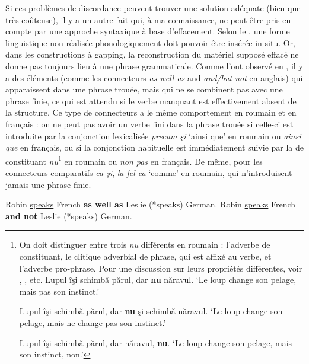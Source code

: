 Si ces problèmes de discordance peuvent trouver une solution adéquate (bien que très coûteuse), il y a un autre fait qui, à ma connaissance, ne peut être pris en compte par une approche syntaxique à base d’effacement. Selon le  \citep{Chomsky1964}, une forme linguistique non réalisée phonologiquement doit pouvoir être insérée in situ. Or, dans les constructions à gapping, la reconstruction du matériel supposé effacé ne donne pas toujours lieu à une phrase grammaticale. Comme l’ont observé \citet{CulicoverEtAl2005} en , il y a des éléments (comme les connecteurs \textit{as well as} and \textit{and/but not} en anglais) qui apparaissent dans une phrase trouée, mais qui ne se combinent pas avec une phrase finie, ce qui est attendu si le verbe manquant est effectivement absent de la structure. Ce type de connecteurs a le même comportement en roumain  et en français  : on ne peut pas avoir un verbe fini dans la phrase trouée si celle-ci est introduite par la conjonction lexicalisée \textit{precum şi} ‘ainsi que’  en roumain ou \textit{ainsi que}  en français, ou si la conjonction habituelle est immédiatement suivie par la  de constituant \textit{nu}\footnote{
 On doit distinguer entre trois \textit{nu} différents en roumain :  l’adverbe  de constituant,  le clitique adverbial  de phrase, qui est affixé au verbe, et  l’adverbe pro-phrase. Pour une discussion sur leurs propriétés différentes, voir \citet{Barbu2004}, \citet{Ionescu2003}, etc.
\ea Lupul îşi schimbă părul, dar \textbf{nu} năravul. \label{ch2:foot74i}
\glt ‘Le loup change son pelage, mais pas son instinct.’
\z

\ea Lupul îşi schimbă părul, dar \textbf{nu}{}-şi schimbă năravul. \label{ch2:foot74ii}
\glt ‘Le loup change son pelage, mais ne change pas son instinct.’
\z

\ea Lupul îşi schimbă părul, dar năravul, \textbf{nu}. \label{ch2:foot74iii}
\glt ‘Le loup change son pelage, mais son instinct, non.’
\z
}  en roumain ou \textit{non pas}  en français. De même, pour les connecteurs comparatifs \textit{ca şi}, \textit{la fel ca} ‘comme’  en roumain, qui n’introduisent jamais une phrase finie. 


\ea \label{ch2:ex238}
\ea Robin \uline{speaks} French \textbf{as well as} Leslie (*speaks) German.   
\ex Robin \uline{speaks} French \textbf{and not} Leslie (*speaks) German.  
\z
\z

